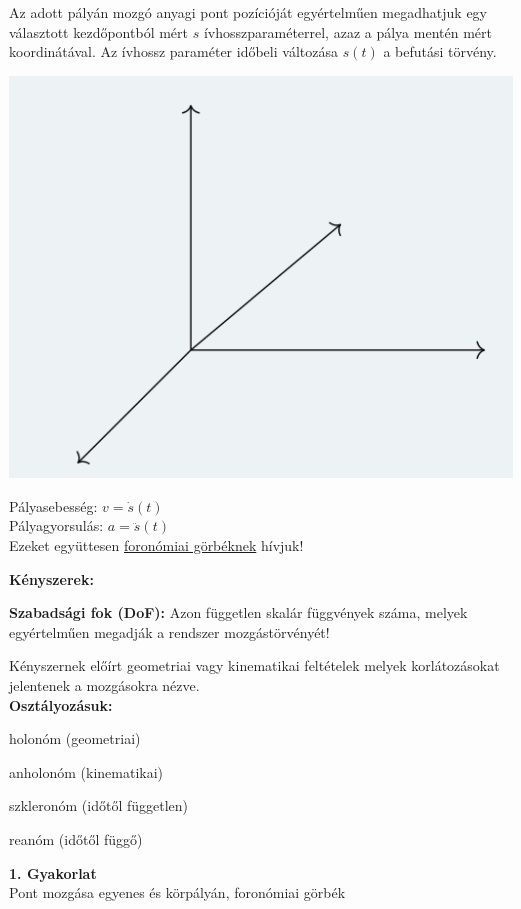 \begin{tcolorbox}[colback=MidnightBlue!5!white,colframe=MidnightBlue!60!black,title= Definíció]
Az adott pályán mozgó anyagi pont pozícióját egyértelműen megadhatjuk egy választott kezdőpontból mért \(s\) ívhosszparaméterrel, azaz a pálya mentén mért koordinátával. Az ívhossz paraméter időbeli változása \(s(t)\) a befutási törvény.
\begin{multicols}{2}
    \includegraphics[scale = 0.7]{Ea_gyak_1/2.png}
    \columnbreak

  Pályasebesség: \(v=\dot{s}(t)\)\\
  Pályagyorsulás: \(a = \ddot{s}(t)\)\\
  Ezeket együttesen \underline{foronómiai görbéknek} hívjuk!
\end{multicols}
\end{tcolorbox}
\newpage
\textbf{Kényszerek:}
\begin{tcolorbox}[colback=MidnightBlue!5!white,colframe=MidnightBlue!60!black,title= Definíció]
    \textbf{Szabadsági fok (DoF):} Azon független skalár függvények száma, melyek egyértelműen megadják a rendszer mozgástörvényét!
    \end{tcolorbox}
\begin{tcolorbox}[colback=MidnightBlue!5!white,colframe=MidnightBlue!60!black,title= Definíció]
    Kényszernek előírt geometriai vagy kinematikai feltételek melyek korlátozásokat jelentenek a mozgásokra nézve.\\
    \textbf{Osztályozásuk:}
    \begin{itemize}
        \begin{multicols}{2}
        \item holonóm (geometriai)
        \item anholonóm (kinematikai)
        
        \columnbreak
        \item szkleronóm (időtől független)
        \item reanóm (időtől függő)
        \end{multicols}
    \end{itemize}
\end{tcolorbox}
\newpage
\begin{center}
    \large \textbf{1. Gyakorlat}\\
    Pont mozgása egyenes és körpályán, foronómiai görbék
\end{center}